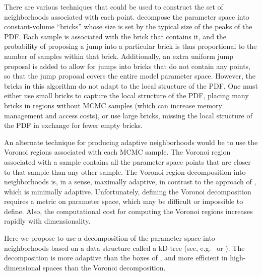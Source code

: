 \documentclass{iopart}
\begin{document}
There are various
techniques that could be used to construct the set of neighborhoods
associated with each point.
\cite{Littenberg2009} decompose the parameter space into
constant-volume ``bricks'' whose size is set by the typical size of
the peaks of the PDF.  Each sample is associated with the brick that
contains it, and the probability of proposing a jump into a particular brick is thus proportional to the
number of samples within that brick.  Additionally, an extra uniform jump proposal is added to allow for jumps into bricks that do not contain any points, so that the jump 
proposal covers the entire model parameter space.  
However, the bricks in this algorithm do not adapt to the local
structure of the PDF.  One must either use small bricks to capture the
local structure of the PDF, placing many bricks in regions without
MCMC samples (which can increase memory management and access costs),
or use large bricks, missing the local structure of the PDF in
exchange for fewer empty bricks.

An alternate technique for producing adaptive neighborhoods would be
to use the Voronoi regions \cite{Voronoi1907} associated with each
MCMC sample.  The Voronoi region associated with a sample contains all
the parameter space points that are closer to that sample than any
other sample.  The Voronoi region decomposition into neighborhoods is,
in a sense, maximally adaptive, in contrast to the approach of
\cite{Littenberg2009}, which is minimally adaptive.
Unfortunately, defining the Voronoi decomposition requires a metric on
parameter space, which may be difficult or impossible to define.
Also, the computational cost for computing the Voronoi regions
increases rapidly with dimensionality.  

Here we propose to use a decomposition of the parameter space into
neighborhoods based on a data structure called a kD-tree (see,
e.g.\ \cite{Berg2008} or \cite{Gaede1998}).  The decomposition is more
adaptive than the boxes of \cite{Littenberg2009}, and more
efficient in high-dimensional spaces than the Voronoi decomposition.
\end{document}

